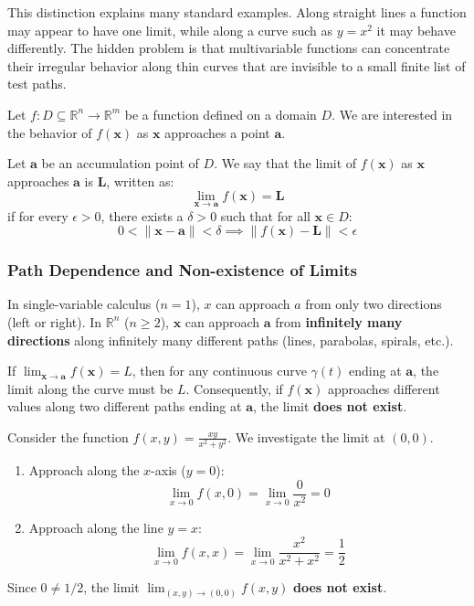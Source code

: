 This distinction explains many standard examples. Along straight lines a function may appear to have one limit, while along a curve such as $y=x^2$ it may behave differently. The hidden problem is that multivariable functions can concentrate their irregular behavior along thin curves that are invisible to a small finite list of test paths.

Let $f: D \subseteq \mathbb{R}^n \to \mathbb{R}^m$ be a function defined on a domain $D$. We are interested in the behavior of $f(\mathbf{x})$ as $\mathbf{x}$ approaches a point $\mathbf{a}$.

\begin{definition}[Limit]
Let $\mathbf{a}$ be an accumulation point of $D$. We say that the limit of $f(\mathbf{x})$ as $\mathbf{x}$ approaches $\mathbf{a}$ is $\mathbf{L}$, written as:
\[ \lim_{\mathbf{x} \to \mathbf{a}} f(\mathbf{x}) = \mathbf{L} \]
if for every $\epsilon > 0$, there exists a $\delta > 0$ such that for all $\mathbf{x} \in D$:
\[ 0 < \|\mathbf{x} - \mathbf{a}\| < \delta \implies \|f(\mathbf{x}) - \mathbf{L}\| < \epsilon \]
\end{definition}

\subsubsection{Path Dependence and Non-existence of Limits}

In single-variable calculus ($n=1$), $x$ can approach $a$ from only two directions (left or right). In $\mathbb{R}^n$ ($n \ge 2$), $\mathbf{x}$ can approach $\mathbf{a}$ from \textbf{infinitely many directions} along infinitely many different paths (lines, parabolas, spirals, etc.).

\begin{theorem}
If $\lim_{\mathbf{x} \to \mathbf{a}} f(\mathbf{x}) = L$, then for any continuous curve $\gamma(t)$ ending at $\mathbf{a}$, the limit along the curve must be $L$.
Consequently, if $f(\mathbf{x})$ approaches different values along two different paths ending at $\mathbf{a}$, the limit \textbf{does not exist}.
\end{theorem}

\newpage

\begin{example}
Consider the function $f(x, y) = \frac{xy}{x^2 + y^2}$. We investigate the limit at $(0,0)$.
\begin{enumerate}
    \item Approach along the $x$-axis ($y=0$):
    \[ \lim_{x \to 0} f(x, 0) = \lim_{x \to 0} \frac{0}{x^2} = 0 \]
    \item Approach along the line $y=x$:
    \[ \lim_{x \to 0} f(x, x) = \lim_{x \to 0} \frac{x^2}{x^2 + x^2} = \frac{1}{2} \]
\end{enumerate}
Since $0 \ne 1/2$, the limit $\lim_{(x,y) \to (0,0)} f(x,y)$ \textbf{does not exist}.
\end{example}

